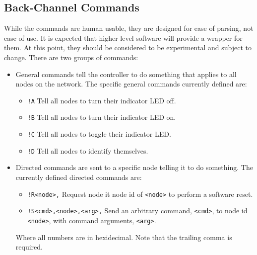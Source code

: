 \documentclass[10pt, openany, draft]{article}
\begin{document}
\subsection{Back-Channel Commands}
While the commands are human usable, they are designed for ease of parsing, not ease of use.  It is expected that higher level software will provide a wrapper for them.  At this point, they should be considered to be experimental and subject to change.  There are two groups of commands:
\begin{itemize}
  \item General commands tell the controller to do something that applies to all nodes on the network.  The specific general commands currently defined are:
  \begin{itemize}
    \item \texttt{!A} Tell all nodes to turn their indicator LED off.
    \item \texttt{!B} Tell all nodes to turn their indicator LED on.
    \item \texttt{!C} Tell all nodes to toggle their indicator LED.
    \item \texttt{!D} Tell all nodes to identify themselves.
  \end{itemize}
  \item Directed commands are sent to a specific node telling it to do something.  The currently defined directed commands are:
  \begin{itemize}
    \item \texttt{!R<node>,} Request node it node id of \texttt{<node>} to perform a software reset.
    \item \texttt{!S<cmd>,<node>,<arg>,} Send an arbitrary command, \texttt{<cmd>}, to node id \texttt{<node>}, with command arguments, \texttt{<arg>}.
  \end{itemize}
  Where all numbers are in hexidecimal.  Note that the trailing comma is required.
\end{itemize}
\end{document}
